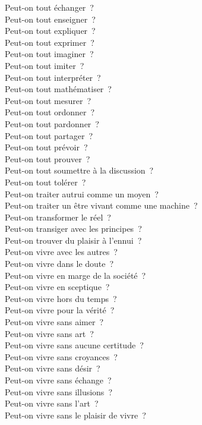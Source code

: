 \documentclass[a4paper,12pt]{article}
\begin{document}
Peut-on tout échanger ? \\
Peut-on tout enseigner ? \\
Peut-on tout expliquer ? \\
Peut-on tout exprimer ? \\
Peut-on tout imaginer ? \\
Peut-on tout imiter ? \\
Peut-on tout interpréter ? \\
Peut-on tout mathématiser ? \\
Peut-on tout mesurer ? \\
Peut-on tout ordonner ? \\
Peut-on tout pardonner ? \\
Peut-on tout partager ? \\
Peut-on tout prévoir ? \\
Peut-on tout prouver ? \\
Peut-on tout soumettre à la discussion ? \\
Peut-on tout tolérer ? \\
Peut-on traiter autrui comme un moyen ? \\
Peut-on traiter un être vivant comme une machine ? \\
Peut-on transformer le réel ? \\
Peut-on transiger avec les principes ? \\
Peut-on trouver du plaisir à l'ennui ? \\
Peut-on vivre avec les autres ? \\
Peut-on vivre dans le doute ? \\
Peut-on vivre en marge de la société ? \\
Peut-on vivre en sceptique ? \\
Peut-on vivre hors du temps ? \\
Peut-on vivre pour la vérité ? \\
Peut-on vivre sans aimer ? \\
Peut-on vivre sans art ? \\
Peut-on vivre sans aucune certitude ? \\
Peut-on vivre sans croyances ? \\
Peut-on vivre sans désir ? \\
Peut-on vivre sans échange ? \\
Peut-on vivre sans illusions ? \\
Peut-on vivre sans l'art ? \\
Peut-on vivre sans le plaisir de vivre ? \\
\end{document}
